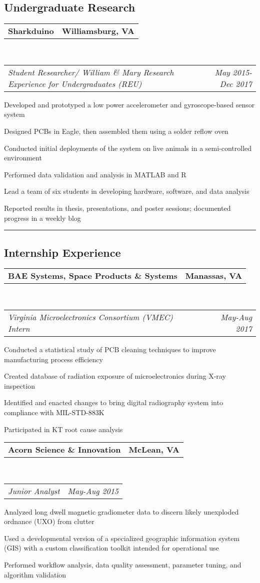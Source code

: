 \documentclass[10pt,letterpaper]{article}
\makeatletter
\newcommand{\headerrow}[2]
{\begin{tabular*}{\linewidth}{l@{\extracolsep{\fill}}r}
	#1 &
	#2 \\
\end{tabular*}}
\makeatother
\begin{document}
\subsection*{Undergraduate Research}

	\headerrow
		{\textbf{Sharkduino}}
		{\textbf{Williamsburg, VA}}
	\\
	\headerrow
		{\emph{Student Researcher/ William \& Mary Research Experience for Undergraduates (REU)}}
		{\emph{May 2015-Dec 2017}}
	\begin{itemize*}
	\item Developed and prototyped a low power accelerometer and gyroscope-based sensor system
	\item Designed PCBs in Eagle, then assembled them using a solder reflow oven
	\item Conducted initial deployments of the system on live animals in a semi-controlled environment
	\item Performed data validation and analysis in MATLAB and R
	\item Lead a team of six students in developing hardware, software, and data analysis
	\item Reported results in thesis, presentations, and poster sessions; documented progress in a weekly blog
	\end{itemize*}
	
\hrule
\vspace{-0.4em}
\subsection*{Internship Experience}
\headerrow
		{\textbf{BAE Systems, Space Products \& Systems}}
		{\textbf{Manassas, VA}}
	\\
	\headerrow
		{\emph{Virginia Microelectronics Consortium (VMEC) Intern}}
		{\emph{May-Aug 2017}}
\begin{itemize*}
		\item Conducted a statistical study of PCB cleaning techniques to improve manufacturing process efficiency
		\item Created database of radiation exposure of microelectronics during X-ray inspection
		\item Identified and enacted changes to bring digital radiography system into compliance with MIL-STD-883K
		\item Participated in KT root cause analysis
	\end{itemize*}
	\headerrow
		{\textbf{Acorn Science \& Innovation}}
		{\textbf{McLean, VA}}
	\\
	\headerrow
		{\emph{Junior Analyst}}
		{\emph{May-Aug 2015}}
	\begin{itemize*}
		\item Analyzed long dwell magnetic gradiometer data to
			discern likely unexploded ordnance (UXO) from clutter
		\item Used a developmental version of a specialized geographic information system (GIS) with 			a custom classification toolkit intended for operational use
		\item Performed workflow analysis, data
quality assessment, parameter tuning, and algorithm validation
	\end{itemize*}
	
\end{document}
